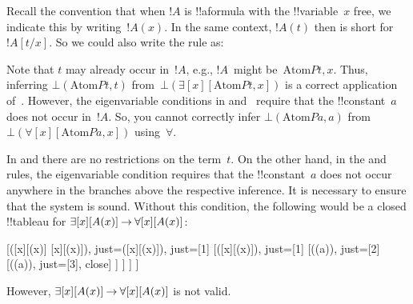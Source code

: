 \documentclass[10pt,a4paper]{article}
\theoremstyle{plain}
\theoremstyle{definition}
\theoremstyle{remark}
\newenvironment{explain}{}{}
\providecommand{\AxiomC}[1]{}
\providecommand{\UnaryInfC}[1]{}
\providecommand{\RightLabel}[1]{}
\newenvironment{prooftree}{}{}
\providecommand{\lif}{\mathbin{\rightarrow}}
\providecommand{\lforall}{\mathord{\forall}}
\providecommand{\lexists}{\mathord{\exists}}
\providecommand{\Subst}[3]{#1[#2/#3]}
\providecommand{\sFmla}[2]{#1(#2)}
\providecommand{\formula}{\relax}
\providecommand{\True}{\top}
\providecommand{\False}{\bot}
\providecommand{\Obj}{}
\providecommand{\TAss}[1]{}
\providecommand{\TRule}[1]{}
\providecommand{\Atom}{\mathrm{Atom}}
\providecommand{\formula}[1]{#1}
\begin{document}
\begin{explain}
Recall the convention that when $!A$ is !!a{formula} with the
!!{variable}~$x$ free, we indicate this by writing~$!A(x)$. In the
same context, $!A(t)$ then is short for~$\Subst{!A}{t}{x}$. So we
could also write the \TRule{\False}{\lexists} rule as:
\begin{prooftree}
  \AxiomC{\sFmla{\False}{\lexists[x][!A]}}
  \RightLabel{\TRule{\False}{\lexists}}
  \UnaryInfC{\sFmla{\False}{\Subst{!A}{t}{x}}}
\end{prooftree}
Note that $t$ may already occur in~$!A$, e.g., $!A$~might
be~$\Atom{\Obj P}{t,x}$. Thus, inferring $\sFmla{\False}{\Atom{\Obj
P}{t,t}}$ from~$ \sFmla{\False}{\lexists[x][\Atom{\Obj P}{t,x}]}$ is
a correct application of~\TRule{\False}{\lexists}. However, the
eigenvariable conditions in \TRule{\False}{\lforall}
and~\TRule{\True}{\lexists} require that the !!{constant}~$a$ does
not occur in~$!A$. So, you cannot correctly infer
$\sFmla{\False}{\Atom{\Obj P}{a,a}}$ from
$\sFmla{\False}{\lforall[x][\Atom{\Obj P}{a,x}]}$
using~$\TRule{\False}{\lforall}$.
\end{explain}

\begin{explain}
In \TRule{\True}{\lforall} and \TRule{\False}{\lexists} there are no
restrictions on the term~$t$. On the other hand, in the
\TRule{\True}{\lexists} and \TRule{\False}{\lforall} rules, the
eigenvariable condition requires that the !!{constant}~$a$ does not
occur anywhere in the branches above the respective inference. It is
necessary to ensure that the system is sound. Without this condition,
the following would be a closed !!{tableau} for
$\lexists[x][\formula{A}(x)] \lif \lforall[x][\formula{A}(x)]$:
\begin{center}
\begin{tableau}{}
  [\sFmla{\False}{\lexists[x][\formula{A}(x)] \lif \lforall[x][\formula{A}(x)]}, just=\TAss
    [\sFmla{\True}{\lexists[x][\formula{A}(x)]},
      just={\TRule{\False}{\lif}[1]}
      [\sFmla{\False}{\lforall[x][\formula{A}(x)]},
        just={\TRule{\False}{\lif}[1]}
        [\sFmla{\True}{\formula{A}(a)},
          just={\TRule{\True}{\lexists}[2]}
          [\sFmla{\False}{\formula{A}(a)},
            just={\TRule{\False}{\lforall}[3]}, close]
        ]
      ]
    ]
  ]
\end{tableau}
\end{center}
However, $\lexists[x][\formula{A}(x)] \lif
\lforall[x][\formula{A}(x)]$ is not valid.
\end{explain}
\end{document}
